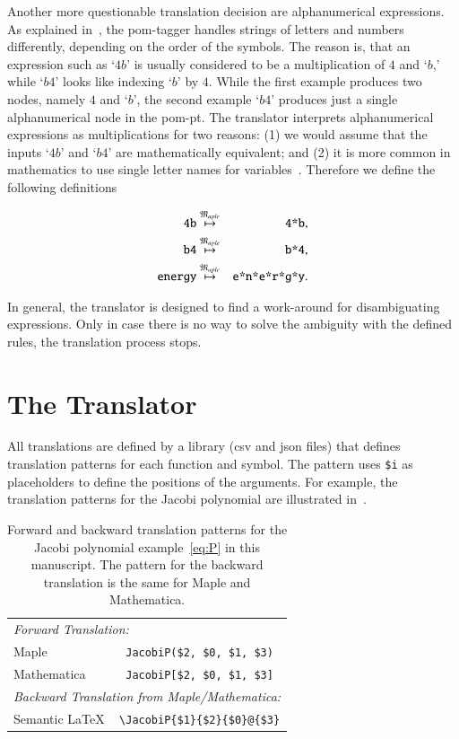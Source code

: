 \documentclass[a4paper,11pt]{article}
\newcommand{\Maple}{Maple}
\newcommand{\Mathematica}{Mathematica}
\newcommand{\langMaple}{\mathfrak{M}_{aple}}
\theoremstyle{defTheoStyle}
\theoremstyle{defExampStyle}
\begin{document}
Another more questionable translation decision are alphanumerical expressions. As explained in~, the \gls*{pom}-tagger handles strings of letters and numbers differently, depending on the order of the symbols. The reason is, that an expression such as `$4b$' is usually considered to be a multiplication of $4$ and `$b$,' while `$b4$' looks like indexing `$b$' by $4$. While the first example produces two nodes, namely $4$ and `$b$', the second example `$b4$' produces just a single alphanumerical node in the \gls*{pom-pt}. The translator interprets alphanumerical expressions as multiplications for two reasons: (1) we would assume that the inputs `$4b$' and `$b4$' are mathematically equivalent; and (2) it is more common in mathematics to use single letter names for variables~\parencite{Notation:History}. Therefore we define the following definitions

\begin{eqnarray*}
\verb|4b| & \overset{\langMaple}{\mapsto} & \verb|4*b|,\\
\verb|b4| & \overset{\langMaple}{\mapsto} & \verb|b*4|,\\
\verb|energy| & \overset{\langMaple}{\mapsto} & \verb|e*n*e*r*g*y|.
\end{eqnarray*}

In general, the translator is designed to find a work-around for disambiguating expressions. Only in case there is no way to solve the ambiguity with the defined rules, the translation process stops.

\section{The Translator}
All translations are defined by a library (\gls*{csv} and \gls*{json} files) that defines translation patterns for each function and symbol. The pattern uses \verb|$i| as placeholders to define the positions of the arguments. For example, the translation patterns for the Jacobi polynomial are illustrated in~.

\begin{table}[ht]
	\centering
	\begin{tabular}{lc}
		\hline
		\multicolumn{2}{l}{\textit{Forward Translation:}} \\
		\Maple & \verb|JacobiP($2, $0, $1, $3)| \\
		\Mathematica & \verb|JacobiP[$2, $0, $1, $3]|\\
		\hline
		\multicolumn{2}{l}{\textit{Backward Translation from \Maple/\Mathematica:}} \\
		Semantic \LaTeX & \verb|\JacobiP{$1}{$2}{$0}@{$3}|\\
		\hline
	\end{tabular}
	\caption{Forward and backward translation patterns for the Jacobi polynomial example~\eqref{eq:P} in this manuscript. The pattern for the backward translation is the same for \Maple{} and \Mathematica.}
	\label{tab:placeholder_ex2}
\end{table}
\end{document}
